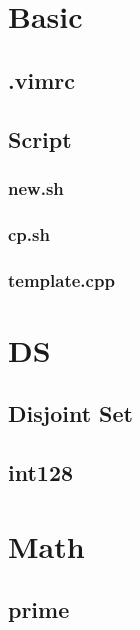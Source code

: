 

\section{Basic}

\subsection{.vimrc}


\subsection{Script}
\subsubsection{new.sh}


\subsubsection{cp.sh}


\subsubsection{template.cpp}


\section{DS}

\subsection{Disjoint Set}


\subsection{int128}


\section{Math}

\subsection{prime}

